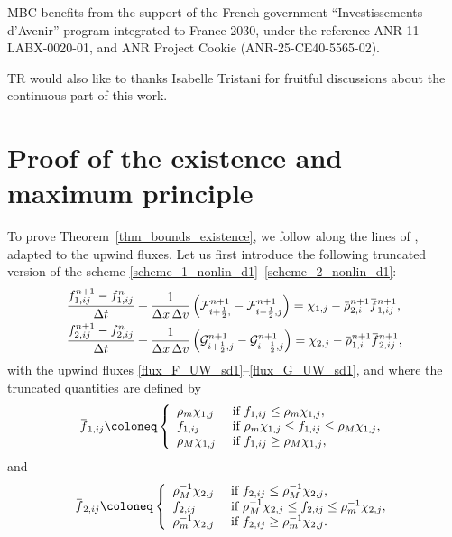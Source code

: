 \documentclass[reqno]{amsart}
\newcommand{\iph}{{i+\frac{1}{2}}}
\newcommand{\imh}{{i-\frac{1}{2}}}
\newcommand{\inv}{^{-1}}
\newcommand{\overbar}[1]{\mkern 1.5mu\overline{\mkern-1.5mu#1\mkern-1.5mu}\mkern 1.5mu}
\numberwithin{equation}{section}
\begin{document}
MBC  benefits from the support of the French government “Investissements d’Avenir” program integrated to France 2030, under the reference ANR-11-LABX-0020-01, and ANR Project Cookie (ANR-25-CE40-5565-02).

TR would also like to thanks Isabelle Tristani for fruitful discussions about the continuous part of this work. 




\appendix

\section{Proof of the existence and maximum principle}\label{app:ExistenceMaxPrinciple}

To prove Theorem~\ref{thm_bounds_existence}, we follow along the lines of  \cite[Theorem 3]{BCLR2025}, adapted to the upwind fluxes. Let us first introduce the following truncated version of the scheme \eqref{scheme_1_nonlin_d1}--\eqref{scheme_2_nonlin_d1}:
\begin{align}
    & \frac{f_{1,ij}^{n+1}-f_{1,ij}^n}{\Delta t}+\frac{1}{\Delta x\,\Delta v}\left(\mathcal{F}_{\iph,}^{n+1}-\mathcal{F}_{\imh,j}^{n+1}\right)=\chi_{1,j}-\overbar{\rho}_{2,i}^{n+1}\overbar{f}_{1,ij}^{n+1} ,\label{scheme_1_nonlin_trunc}\\
    & \frac{f_{2,ij}^{n+1}-f_{2,ij}^n}{\Delta t}+\frac{1}{\Delta x\,\Delta v}\left(\mathcal{G}_{\iph,j}^{n+1}-\mathcal{G}_{\imh,j}^{n+1}\right)=\chi_{2,j}-\overbar{\rho}_{1,i}^{n+1}\overbar{f}_{2,ij}^{n+1},\label{scheme_2_nonlin_trunc}
\end{align}
with the upwind fluxes \eqref{flux_F_UW_sd1}--\eqref{flux_G_UW_sd1}, and where the truncated quantities are defined by
\begin{equation}\label{def_f_trunc}
    \overbar{f}_{1,ij}\coloneq\left\{\begin{array}{ll}
        \rho_m\chi_{1,j} & \text{ if } f_{1,ij}\leq \rho_m\chi_{1,j},  \\
        f_{1,ij} & \text{ if } \rho_m\chi_{1,j}\leq f_{1,ij}\leq \rho_M\chi_{1,j},\\
        \rho_M\chi_{1,j} & \text{ if } f_{1,ij} \geq \rho_M\chi_{1,j},
    \end{array}\right.
\end{equation}
and
\begin{equation}\label{def_g_trunc}
    \overbar{f}_{2,ij}\coloneq\left\{\begin{array}{ll}
        \rho_M\inv\chi_{2,j} & \text{ if } f_{2,ij}\leq \rho_M\inv\chi_{2,j},  \\
        f_{2,ij} & \text{ if } \rho_M\inv\chi_{2,j}\leq f_{2,ij}\leq \rho_m\inv\chi_{2,j},\\
        \rho_m\inv\chi_{2,j} & \text{ if } f_{2,ij} \geq \rho_m\inv\chi_{2,j}.
    \end{array}\right.
\end{equation}
\end{document}

